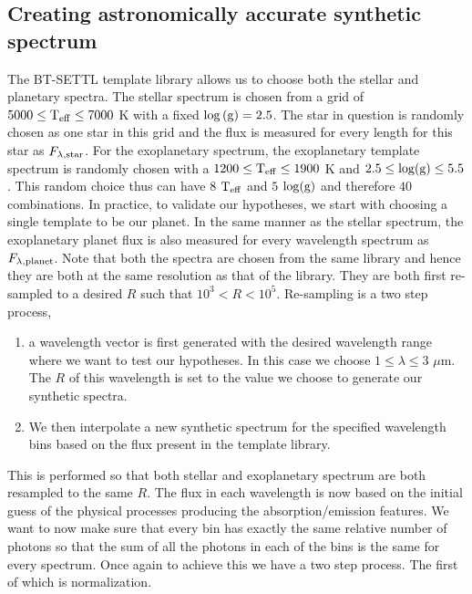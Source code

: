 \subsection{Creating astronomically accurate synthetic spectrum}
The \textsc{BT-SETTL} template library allows us to choose both the stellar and planetary spectra.
The stellar spectrum is chosen from a grid of $5000\le \rm{T_{eff}} \le 7000$ K with a fixed $\log\rm{(g)} = 2.5$. 
The star in question is randomly chosen as one star in this grid and the flux is measured for every length for this star as $F_{\rm{\lambda,star}}$.
For the exoplanetary spectrum, the exoplanetary template spectrum is randomly chosen with a $1200 \le \rm{T_{eff}} \le 1900$ K and  $2.5 \le \rm{\log(g)}\le  5.5$. 
This random choice thus can have $8$ $\rm{T_{eff}}$ and $5$ $\rm{\log(g)}$ and therefore $40$ combinations.
In practice, to validate our hypotheses, we start with choosing a single template to be our planet.
In the same manner as the stellar spectrum, the exoplanetary planet flux is also measured for every wavelength spectrum as $F_{\rm{\lambda,planet}}$.
Note that both the spectra are chosen from the same library and hence they are both at the same resolution as that of the library. 
They are both first re-sampled to a desired $R$ such that $10^3<R<10^5$.
Re-sampling is a two step process,
\begin{enumerate}
    \item a wavelength vector is first generated with the desired wavelength range where we want to test our hypotheses. 
    In this case we choose $1\le \lambda\le 3$ $\mu$m.
    The $R$ of this wavelength is set to the value we choose to generate our synthetic spectra.
    \item We then interpolate a new synthetic spectrum for the specified wavelength bins based on the flux present in the template library.
\end{enumerate}
This is performed so that both stellar and exoplanetary spectrum are both resampled to the same $R$.
The flux in each wavelength is now based on the initial guess of the physical processes producing the absorption/emission features.
We want to now make sure that every bin has exactly the same relative number of photons so that the sum of all the photons in each of the bins is the same for every spectrum.
Once again to achieve this we have a two step process.
The first of which is normalization.
